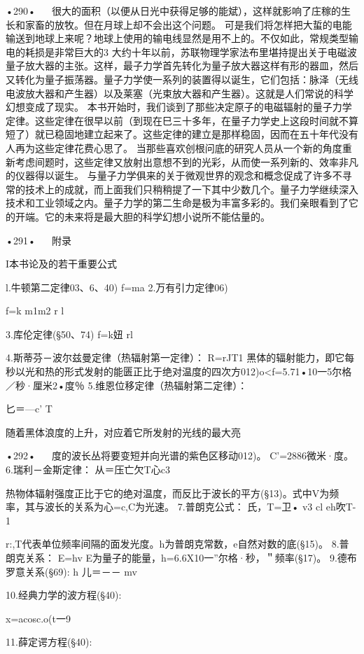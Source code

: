 •290•
  
很大的面积（以便从日光中获得足够的能斌），这样就影响了庄稼的生长和家畜的放牧。但在月球上却不会出这个问题。
可是我们将怎样把大蜇的电能输送到地球上来呢？地球上使用的输电线显然是用不上的。不仅如此，常规类型输电的耗损是非常巨大的3
大约十年以前，苏联物理学家法布里堪持提出关于电磁波量子放大器的主张。这样，最子力学首先转化为量子放大器这样有形的器皿，然后又转化为量子振荡器。量子力学使一系列的装置得以诞生，它们包括：脉泽（无线电波放大器和产生器）以及莱塞（光束放大器和产生器）。这就是人们常说的科学幻想变成了现实。
本书开始时，我们谈到了那些决定原子的电磁辐射的量子力学定律。这些定律在很早以前（到现在巳三十多年，在量子力学史上这段时间就不算短了）就已稳固地建立起来了。这些定律的建立是那样稳固，因而在五十年代没有人再为这些定律花费心思了。
当那些喜欢创根问底的研究人员从一个新的角度重新考虑间题时，这些定律又放射出意想不到的光彩，从而使一系列新的、效率非凡的仪器得以诞生。
与量子力学俱来的关于微观世界的观念和概念促成了许多不寻常的技术上的成就，而上面我们只稍稍提了一下其中少数几个。量子力学继续深入技术和工业领域之内。量子力学的第二生命是极为丰富多彩的。我们亲眼看到了它的开端。它的未来将是最大胆的科学幻想小说所不能估量的。

•291•
  
附录

I本书论及的若干重要公式

l.牛顿第二定律03、6、40)
f=ma
2.万有引力定律06)

f=k
m1m2
r
l

3.库伦定律(§50、74)
f=k妞
rl

4.斯蒂芬－波尔兹曼定律（热辐射第一定律）：
R=rJT1
黑体的辐射能力，即它每秒以光和热的形式发射的能匮正比于绝对温度的四次方012)o<f=5.71•10一5尔格／秒·厘米2•度％
5.维恩位移定律（热辐射第二定律）：

匕＝—c'
T

随着黑体浪度的上升，对应着它所发射的光线的最大亮

•292•
  
度的波长丛将要变短并向光谱的紫色区移动012)。
C'=2886微米·度。
6.瑞利－金斯定律：
从＝压亡欠T心c3

热物体辐射强度正比于它的绝对温度，而反比于波长的平方(§13)。式中V为频率，其与波长的关系为心=c,C为光速。
7.普朗克公式：
	氏，T=卫•	v3
	cl	eh吹T-1

r:,T代表单位频率间隔的面发光度。h为普朗克常数，e自然对数的底(§15)。
8.普朗克关系：
E=hv
E为量子的能量，h=6.6X10一”尔格·秒，＂频率(§17)。
9.德布罗意关系(§69):
h
儿＝－－
mv

10.经典力学的波方程(§40):

x=acosc.o(t一9

11.薛定谔方程(§40):

